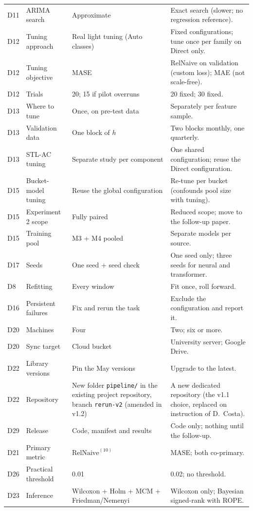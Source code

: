 \documentclass[11pt,a4paper]{article}
\newcommand{\code}[1]{\texttt{#1}}
\newcommand{\RN}{\mathrm{RelNaive}^{(10)}}
\begin{document}
{\begin{longtable}{@{}p{0.8cm} p{3.2cm} p{4.0cm} p{7.0cm}@{}}
D11 & ARIMA search & Approximate & Exact search (slower; no regression reference). \\
D12 & Tuning approach & Real light tuning (Auto classes) & Fixed configurations; tune once per family on Direct only. \\
D12 & Tuning objective & MASE & RelNaive on validation (custom loss); MAE (not scale-free). \\
D12 & Trials & 20; 15 if pilot overruns & 20 fixed; 30 fixed. \\
D13 & Where to tune & Once, on pre-test data & Separately per feature sample. \\
D13 & Validation data & One block of $h$ & Two blocks monthly, one quarterly. \\
D13 & STL-AC tuning & Separate study per component & One shared configuration; reuse the Direct configuration. \\
D15 & Bucket-model tuning & Reuse the global configuration & Re-tune per bucket (confounds pool size with tuning). \\
D15 & Experiment 2 scope & Fully paired & Reduced scope; move to the follow-up paper. \\
D15 & Training pool & M3 + M4 pooled & Separate models per source. \\
D17 & Seeds & One seed + seed check & One seed only; three seeds for neural and transformer. \\
D8 & Refitting & Every window & Fit once, roll forward. \\
D16 & Persistent failures & Fix and rerun the task & Exclude the configuration and report it. \\
D20 & Machines & Four & Two; six or more. \\
D20 & Sync target & Cloud bucket & University server; Google Drive. \\
D22 & Library versions & Pin the May versions & Upgrade to the latest. \\
D22 & Repository & New folder \code{pipeline/} in the existing project repository, branch \code{rerun-v2} (amended in v1.2) & A new dedicated repository (the v1.1 choice, replaced on instruction of D.\ Costa). \\
D29 & Release & Code, manifest and results & Code only; nothing until the follow-up. \\
D21 & Primary metric & $\RN$ & MASE; both co-primary. \\
D26 & Practical threshold & 0.01 & 0.02; no threshold. \\
D23 & Inference & Wilcoxon + Holm + MCM + Friedman/Nemenyi & Wilcoxon only; Bayesian signed-rank with ROPE. \\

\end{longtable}}
\end{document}
